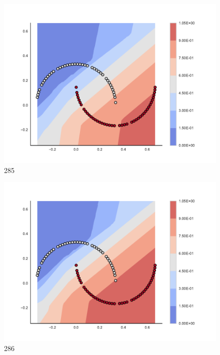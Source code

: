 \begin{subfigure}[b]{0.09\textwidth}
    \includegraphics[clip, trim=2.35cm 1.75cm 4.5cm 0cm,width=\textwidth]{img/convergence/285.pdf}
    \caption{285}
    \label{fig:convergence_285}
\end{subfigure}
%
\begin{subfigure}[b]{0.09\textwidth}
    \includegraphics[clip, trim=2.35cm 1.75cm 4.5cm 0cm,width=\textwidth]{img/convergence/286.pdf}
    \caption{286}
    \label{fig:convergence_286}
\end{subfigure}
%
